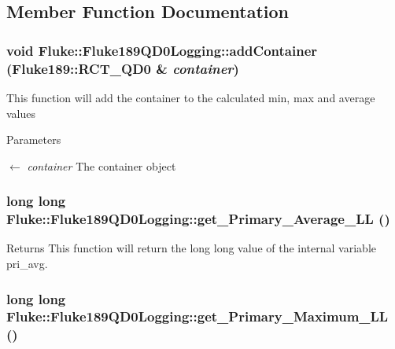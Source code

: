 \subsection{Member Function Documentation}
\hypertarget{classFluke_1_1Fluke189QD0Logging_af06d4058c124e5b13893311145d529d2}{
\subsubsection[{addContainer}]{\setlength{\rightskip}{0pt plus 5cm}void Fluke::Fluke189QD0Logging::addContainer ({\bf Fluke189::RCT\_\-QD0} \& {\em container})}}
\label{classFluke_1_1Fluke189QD0Logging_af06d4058c124e5b13893311145d529d2}
This function will add the container to the calculated min, max and average values 
\begin{DoxyParams}{Parameters}
\item[\mbox{$\leftarrow$} {\em container}]The container object \end{DoxyParams}
\hypertarget{classFluke_1_1Fluke189QD0Logging_a29473a5a7d016d020f0948fcf3e31e50}{
\subsubsection[{get\_\-Primary\_\-Average\_\-LL}]{\setlength{\rightskip}{0pt plus 5cm}long long Fluke::Fluke189QD0Logging::get\_\-Primary\_\-Average\_\-LL ()}}
\label{classFluke_1_1Fluke189QD0Logging_a29473a5a7d016d020f0948fcf3e31e50}
\begin{DoxyReturn}{Returns}
This function will return the long long value of the internal variable pri\_\-avg. 
\end{DoxyReturn}
\hypertarget{classFluke_1_1Fluke189QD0Logging_a583f6614ac6b917bb151cd4cd93dc41d}{
\subsubsection[{get\_\-Primary\_\-Maximum\_\-LL}]{\setlength{\rightskip}{0pt plus 5cm}long long Fluke::Fluke189QD0Logging::get\_\-Primary\_\-Maximum\_\-LL ()}}
